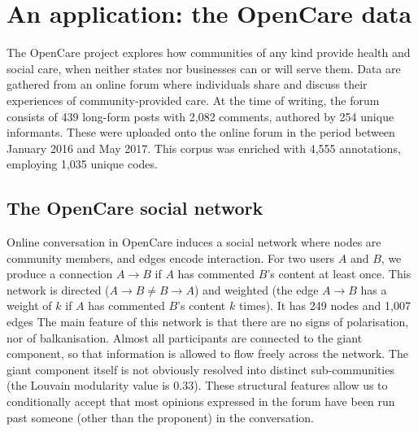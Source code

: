 \documentclass{llncs}
\begin{document}
\section{An application: the OpenCare data} \label{sec_opencare_data}


The OpenCare project explores how communities of any kind provide health and social care, when neither states nor businesses can or will serve them. Data are gathered from an online forum where individuals share and discuss their experiences of community-provided care. At the time of writing, the forum consists of 439 long-form posts with 2,082 comments, authored by 254 unique informants. These were uploaded onto the online forum in the period between January 2016 and May 2017. This corpus was enriched with 4,555 annotations, employing 1,035 unique codes. 



\subsection{The OpenCare social network} \label{ssec_social_network}

Online conversation in OpenCare induces a social network where nodes are community members, and edges encode interaction. For two users $A$ and $B$, we produce a connection $A \rightarrow B$ if $A$ has commented $B$'s content at least once. This network is directed ($A \rightarrow B \neq B \rightarrow A$) and weighted (the edge $A \rightarrow B$ has a weight of $k$ if $A$ has commented $B$'s content $k$ times). It has 249 nodes and 1,007 edges
The main feature of this network is that there are no signs of polarisation, nor of balkanisation. Almost all participants are connected to the giant component, so that information is allowed to flow freely across the network. The giant component itself is not obviously resolved into distinct sub-communities (the Louvain modularity value is 0.33). These structural features allow us to conditionally accept that most opinions expressed in the forum have been run past someone (other than the proponent) in the conversation.
\end{document}
